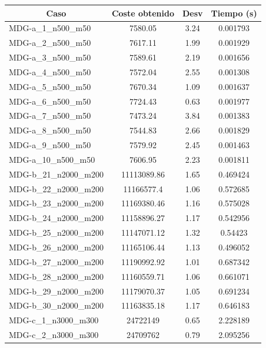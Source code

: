\documentclass[11pt,a4paper]{article}
\begin{document}
\begin{table}[H]
	\begin{center}
	\begin{tabular}{|l|c|c|c|} 
		\hline
		\multicolumn{1}{|c|}{\textbf{Caso}} & \textbf{Coste obtenido} & \textbf{Desv} & \textbf{Tiempo (s)} \\ \hline
			MDG-a\_1\_n500\_m50 & 7580.05 & 3.24 & 0.001793 \\ \hline
			MDG-a\_2\_n500\_m50 & 7617.11 & 1.99 & 0.001929 \\ \hline
			MDG-a\_3\_n500\_m50 & 7589.61 & 2.19 & 0.001656 \\ \hline
			MDG-a\_4\_n500\_m50 & 7572.04 & 2.55 & 0.001308 \\ \hline
			MDG-a\_5\_n500\_m50 & 7670.34 & 1.09 & 0.001637 \\ \hline
			MDG-a\_6\_n500\_m50 & 7724.43 & 0.63 & 0.001977 \\ \hline
			MDG-a\_7\_n500\_m50 & 7473.24 & 3.84 & 0.001383 \\ \hline
			MDG-a\_8\_n500\_m50 & 7544.83 & 2.66 & 0.001829 \\ \hline
			MDG-a\_9\_n500\_m50 & 7579.92 & 2.45 & 0.001463 \\ \hline
			MDG-a\_10\_n500\_m50 & 7606.95 & 2.23 & 0.001811 \\ \hline
			MDG-b\_21\_n2000\_m200 & 11113089.86 & 1.65 & 0.469424 \\ \hline
			MDG-b\_22\_n2000\_m200 & 11166577.4 & 1.06 & 0.572685 \\ \hline
			MDG-b\_23\_n2000\_m200 & 11169380.46 & 1.16 & 0.575028 \\ \hline
			MDG-b\_24\_n2000\_m200 & 11158896.27 & 1.17 & 0.542956 \\ \hline
			MDG-b\_25\_n2000\_m200 & 11147071.12 & 1.32 & 0.54423 \\ \hline
			MDG-b\_26\_n2000\_m200 & 11165106.44 & 1.13 & 0.496052 \\ \hline
			MDG-b\_27\_n2000\_m200 & 11190992.92 & 1.01 & 0.687342 \\ \hline
			MDG-b\_28\_n2000\_m200 & 11160559.71 & 1.06 & 0.661071 \\ \hline
			MDG-b\_29\_n2000\_m200 & 11179070.37 & 1.05 & 0.691234 \\ \hline
			MDG-b\_30\_n2000\_m200 & 11163835.18 & 1.17 & 0.646183 \\ \hline
			MDG-c\_1\_n3000\_m300 & 24722149 & 0.65 & 2.228189 \\ \hline
			MDG-c\_2\_n3000\_m300 & 24709762 & 0.79 & 2.095256 \\ \hline

\end{tabular}
\end{center}
\end{table}
\end{document}
